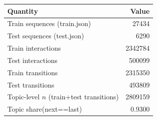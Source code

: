\begin{tabular}{lr}
\toprule
Quantity & Value \\
\midrule
Train sequences (train.json) & 27434 \\
Test sequences (test.json) & 6290 \\
Train interactions & 2342784 \\
Test interactions & 500099 \\
Train transitions & 2315350 \\
Test transitions & 493809 \\
Topic-level $n$ (train+test transitions) & 2809159 \\
Topic share(next==last) & 0.9300 \\
\bottomrule
\end{tabular}

